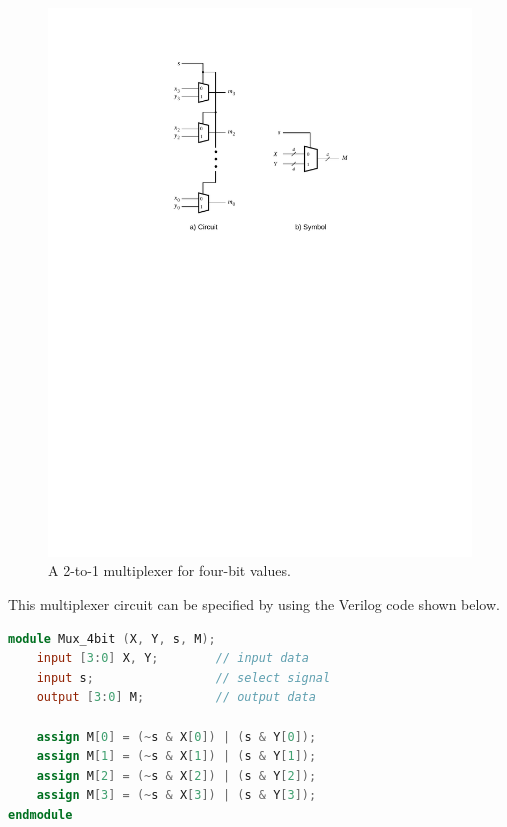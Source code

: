 \documentclass[11pt, twoside, pdftex]{article}
\begin{document}
\begin{figure}[H]
   \begin{center}
      \includegraphics[scale=1.0]{figures/mux_4bit.pdf}
   \caption{A 2-to-1 multiplexer for four-bit values.} 
	 \label{fig:mux_4bit}
	 \end{center}
\end{figure}

This multiplexer circuit can be specified by using the Verilog code shown below.
~\\
\begin{lstlisting}[language=Verilog]
module Mux_4bit (X, Y, s, M);
    input [3:0] X, Y;        // input data
    input s;                 // select signal
    output [3:0] M;          // output data

    assign M[0] = (~s & X[0]) | (s & Y[0]);
    assign M[1] = (~s & X[1]) | (s & Y[1]);
    assign M[2] = (~s & X[2]) | (s & Y[2]);
    assign M[3] = (~s & X[3]) | (s & Y[3]);
endmodule
\end{lstlisting}
\end{document}
